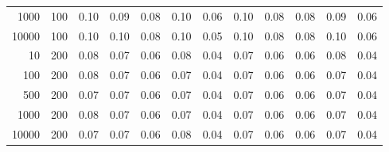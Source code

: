 \begin{table}[ht]
\begin{tabular}{rrrrrrrrrrrr}
  1000 & 100 & 0.10 & 0.09 & 0.08 & 0.10 & 0.06 & 0.10 & 0.08 & 0.08 & 0.09 & 0.06 \\ 
  10000 & 100 & 0.10 & 0.10 & 0.08 & 0.10 & 0.05 & 0.10 & 0.08 & 0.08 & 0.10 & 0.06 \\ 
  10 & 200 & 0.08 & 0.07 & 0.06 & 0.08 & 0.04 & 0.07 & 0.06 & 0.06 & 0.08 & 0.04 \\ 
  100 & 200 & 0.08 & 0.07 & 0.06 & 0.07 & 0.04 & 0.07 & 0.06 & 0.06 & 0.07 & 0.04 \\ 
  500 & 200 & 0.07 & 0.07 & 0.06 & 0.07 & 0.04 & 0.07 & 0.06 & 0.06 & 0.07 & 0.04 \\ 
  1000 & 200 & 0.08 & 0.07 & 0.06 & 0.07 & 0.04 & 0.07 & 0.06 & 0.06 & 0.07 & 0.04 \\ 
  10000 & 200 & 0.07 & 0.07 & 0.06 & 0.08 & 0.04 & 0.07 & 0.06 & 0.06 & 0.07 & 0.04 \\ 
   \hline
\end{tabular}
\end{table}
